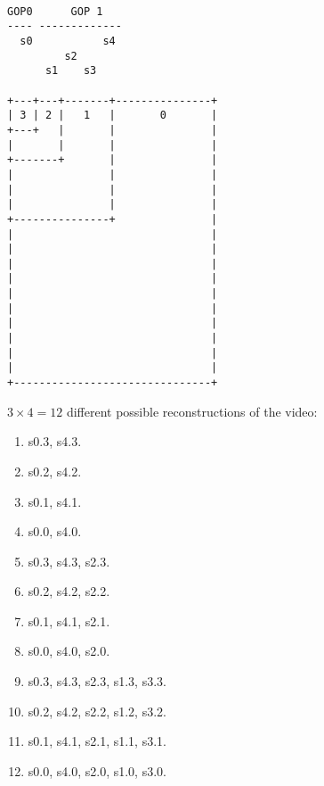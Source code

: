 \begin{verbatim}

GOP0      GOP 1
---- -------------
  s0           s4
         s2
      s1    s3

+---+---+-------+---------------+
| 3 | 2 |   1   |       0       |
+---+   |       |               |
|       |       |               |
+-------+       |               |
|               |               |
|               |               |
|               |               |
+---------------+               |
|                               |
|                               |
|                               |
|                               |
|                               |
|                               |
|                               |
|                               |
|                               |
|                               |
+-------------------------------+
\end{verbatim}

$3\times 4=12$ different possible reconstructions of the video:
\begin{enumerate}
\item s0.3, s4.3.
\item s0.2, s4.2.
\item s0.1, s4.1.
\item s0.0, s4.0.
\item s0.3, s4.3, s2.3.
\item s0.2, s4.2, s2.2.
\item s0.1, s4.1, s2.1.
\item s0.0, s4.0, s2.0.
\item s0.3, s4.3, s2.3, s1.3, s3.3.
\item s0.2, s4.2, s2.2, s1.2, s3.2.
\item s0.1, s4.1, s2.1, s1.1, s3.1.
\item s0.0, s4.0, s2.0, s1.0, s3.0.
\end{enumerate}

